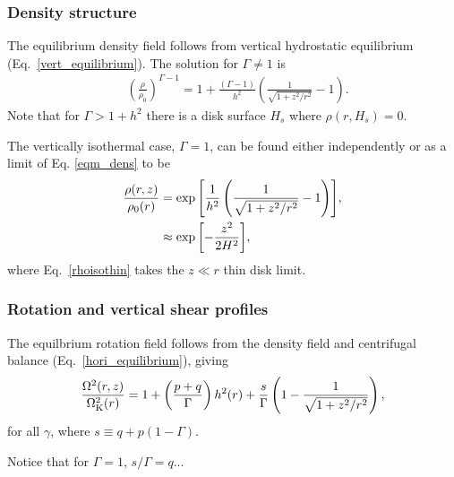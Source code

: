 \subsubsection{Density structure}
The equilibrium density field follows from vertical hydrostatic equilibrium (Eq.\ \ref{vert_equilibrium}).
The solution for $\Gamma\neq1$ is
\begin{align}\label{eqm_dens}
  &\left(\frac{\rho}{\rho_0}\right)^{\Gamma-1} = 1 +
  \frac{\left(\Gamma-1\right)}{ h^2}\left(\frac{1}{\sqrt{1+z^2/r^2}}-1\right).
\end{align}
Note that for $\Gamma > 1 +  h^2$ there is a disk surface $H_s$
where $\rho(r,H_s)=0$. 

The vertically isothermal case, $\Gamma = 1$, can be found either 
independently or as a limit of Eq. \ref{eqm_dens} to be 
\begin{align}
  \frac{\rho(r,z)}{\rho_0(r)} &=
  \exp{\left[\frac{1}{ h^2}\left(\frac{1}{\sqrt{1+z^2/r^2}}-1\right)\right]},   \\
  & \approx \exp {\left[ - {z^2 \over 2 H^2}\right]} \label{rhoisothin},
  \end{align}
  where Eq.\ \ref{rhoisothin} takes the $z \ll r$ thin disk limit.  
 
 \subsubsection{Rotation and vertical shear profiles}
The equilbrium rotation field follows from the density field and centrifugal balance (Eq.\ \ref{hori_equilibrium}),
giving 
\begin{align}\label{eqm_rot}
  \frac{\Omega^2(r,z)}{\Omega_{\rm K}^2(r)}=1 +
  \left(\frac{p+q}{\Gamma}\right) h^2(r) 
  +\frac{s}{\Gamma} \left(1-\frac{1}{\sqrt{1+z^2/r^2}}\right), 
\end{align}
for all $\gamma$, where $s\equiv q+p(1-\Gamma)$.  


Notice that for $\Gamma = 1$, $s/\Gamma = q$...

